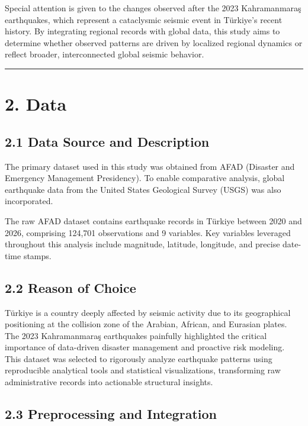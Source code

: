 \documentclass[
  11pt,
  a4paper,
  DIV=11,
  numbers=noendperiod]{scrartcl}
\begin{document}
Special attention is given to the changes observed after the 2023
Kahramanmaraş earthquakes, which represent a cataclysmic seismic event
in Türkiye's recent history. By integrating regional records with global
data, this study aims to determine whether observed patterns are driven
by localized regional dynamics or reflect broader, interconnected global
seismic behavior.

\begin{center}\rule{0.5\linewidth}{0.5pt}\end{center}

\section{2. Data}\label{data}

\subsection{2.1 Data Source and
Description}\label{data-source-and-description}

The primary dataset used in this study was obtained from AFAD (Disaster
and Emergency Management Presidency). To enable comparative analysis,
global earthquake data from the United States Geological Survey (USGS)
was also incorporated.

The raw AFAD dataset contains earthquake records in Türkiye between 2020
and 2026, comprising 124,701 observations and 9 variables. Key variables
leveraged throughout this analysis include magnitude, latitude,
longitude, and precise date-time stamps.

\subsection{2.2 Reason of Choice}\label{reason-of-choice}

Türkiye is a country deeply affected by seismic activity due to its
geographical positioning at the collision zone of the Arabian, African,
and Eurasian plates. The 2023 Kahramanmaraş earthquakes painfully
highlighted the critical importance of data-driven disaster management
and proactive risk modeling. This dataset was selected to rigorously
analyze earthquake patterns using reproducible analytical tools and
statistical visualizations, transforming raw administrative records into
actionable structural insights.

\subsection{2.3 Preprocessing and
Integration}\label{preprocessing-and-integration}
\end{document}
